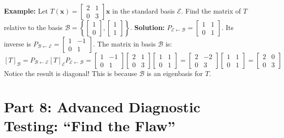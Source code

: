 \documentclass[11pt]{article}
\begin{document}
\textbf{Example:} Let $T(\mathbf{x}) = \begin{bmatrix} 2 & 1 \\ 0 & 3 \end{bmatrix} \mathbf{x}$ in the standard basis $\mathcal{E}$. Find the matrix of $T$ relative to the basis $\mathcal{B} = \left\{ \begin{bmatrix} 1 \\ 0 \end{bmatrix}, \begin{bmatrix} 1 \\ 1 \end{bmatrix} \right\}$.
\textbf{Solution:} 
$P_{\mathcal{E} \leftarrow \mathcal{B}} = \begin{bmatrix} 1 & 1 \\ 0 & 1 \end{bmatrix}$. Its inverse is $P_{\mathcal{B} \leftarrow \mathcal{E}} = \begin{bmatrix} 1 & -1 \\ 0 & 1 \end{bmatrix}$.
The matrix in basis $\mathcal{B}$ is:
\[ [T]_{\mathcal{B}} = P_{\mathcal{B} \leftarrow \mathcal{E}} [T]_{\mathcal{E}} P_{\mathcal{E} \leftarrow \mathcal{B}} = \begin{bmatrix} 1 & -1 \\ 0 & 1 \end{bmatrix} \begin{bmatrix} 2 & 1 \\ 0 & 3 \end{bmatrix} \begin{bmatrix} 1 & 1 \\ 0 & 1 \end{bmatrix} = \begin{bmatrix} 2 & -2 \\ 0 & 3 \end{bmatrix} \begin{bmatrix} 1 & 1 \\ 0 & 1 \end{bmatrix} = \begin{bmatrix} 2 & 0 \\ 0 & 3 \end{bmatrix} \]
Notice the result is diagonal! This is because $\mathcal{B}$ is an eigenbasis for $T$.

\section{Part 8: Advanced Diagnostic Testing: ``Find the Flaw''}
\end{document}
